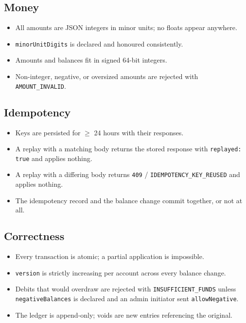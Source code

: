 \documentclass[11pt,a4paper]{article}
\newcommand{\code}[1]{\texttt{\small #1}}
\begin{document}
\subsection*{Money}
\begin{itemize}[label=$\square$]
\item All amounts are JSON integers in minor units; no floats appear anywhere.
\item \code{minorUnitDigits} is declared and honoured consistently.
\item Amounts and balances fit in signed 64-bit integers.
\item Non-integer, negative, or oversized amounts are rejected with \code{AMOUNT\_INVALID}.
\end{itemize}

\subsection*{Idempotency}
\begin{itemize}[label=$\square$]
\item Keys are persisted for $\geq$ 24 hours with their responses.
\item A replay with a matching body returns the stored response with \code{replayed: true} and
      applies nothing.
\item A replay with a differing body returns \code{409} / \code{IDEMPOTENCY\_KEY\_REUSED} and
      applies nothing.
\item The idempotency record and the balance change commit together, or not at all.
\end{itemize}

\subsection*{Correctness}
\begin{itemize}[label=$\square$]
\item Every transaction is atomic; a partial application is impossible.
\item \code{version} is strictly increasing per account across every balance change.
\item Debits that would overdraw are rejected with \code{INSUFFICIENT\_FUNDS} unless
      \code{negativeBalances} is declared and an admin initiator sent \code{allowNegative}.
\item The ledger is append-only; voids are new entries referencing the original.
\end{itemize}
\end{document}
